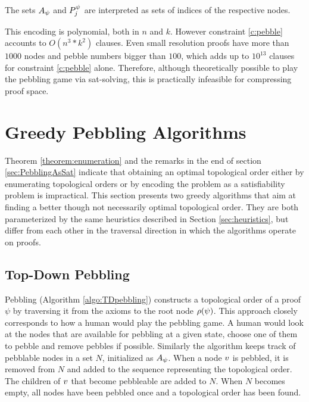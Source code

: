 \documentclass{llncs}
\begin{document}
The sets $A_{\psi}$ and $P_{j}^{\psi}$ are interpreted as sets of indices of the respective nodes.

\noindent
This encoding is polynomial, both in $n$ and $k$. However constraint \ref{c:pebble} accounts to $O(n^3*k^2)$ clauses. Even small resolution proofs have more than $1000$ nodes and pebble numbers bigger than $100$, which adds up to $10^{13}$ clauses for constraint \ref{c:pebble} alone. Therefore, although theoretically possible to play the pebbling game via sat-solving, this is practically infeasible for compressing proof space.


\section{Greedy Pebbling Algorithms}
\label{sec:algorithms}

Theorem \ref{theorem:enumeration} and the remarks in the end of section \ref{sec:PebblingAsSat} indicate that obtaining an optimal topological order either by enumerating topological orders or by encoding the problem as a satisfiability problem is impractical. This section presents two greedy algorithms that aim at finding a better though not necessarily optimal topological order. They are both parameterized by the same heuristics described in Section \ref{sec:heuristics}, but differ from each other in the traversal direction in which the algorithms operate on proofs.

\subsection{Top-Down Pebbling}

 Pebbling (Algorithm \ref{algo:TDpebbling}) constructs a topological order of a proof $\psi$ by traversing it from the axioms to the root node $\rho(\psi)$.
This approach closely corresponds to how a human would play the pebbling game. 
A human would look at the nodes that are available for pebbling at a given state, choose one of them to pebble and remove pebbles if possible.
Similarly the algorithm keeps track of pebblable nodes in a set $N$, initialized as $A_{\psi}$.
When a node $v$ is pebbled, it is removed from $N$ and added to the sequence representing the topological order. The children of $v$ that become pebbleable are added to $N$.
When $N$ becomes empty, all nodes have been pebbled once and a topological order has been found.
\end{document}
